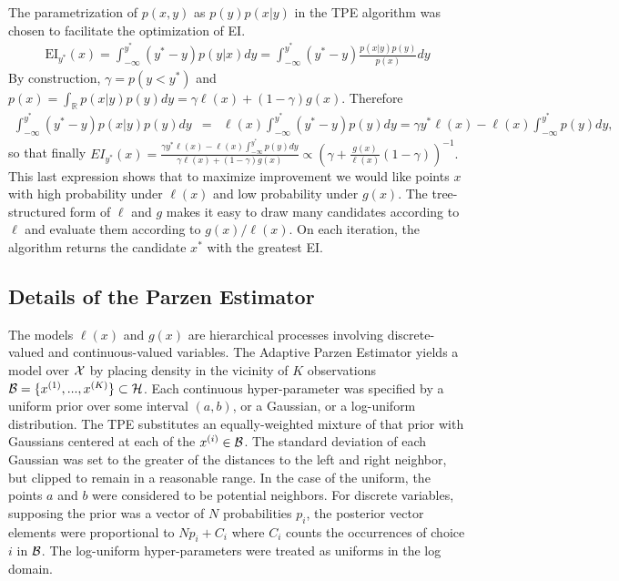 \documentclass{article}
\newcommand{\vs}[1]{\vspace*{-#1mm}}
\newcommand{\Bss}{\vs{1}}
\newcommand{\ass}{\vs{0.7}}
\begin{document}
The parametrization of $p(x, y)$ as $p(y)p(x|y)$ in the TPE algorithm was
chosen to facilitate the optimization of EI.
\begin{align}
    \mathrm{EI}_{y^*}(x)
    = \int_{-\infty}^{y^*} (y^* - y)p(y|x) dy
    = \int_{-\infty}^{y^*} (y^* - y) \frac{p(x|y)p(y)}{p(x)}
    dy
\end{align}
By construction, $\gamma = p(y<y^*)$ and
$
p(x) = \int_\mathbb{R} p(x\vert y) p(y) dy = \gamma \ell(x) +
(1-\gamma) g(x).
$
Therefore
\begin{eqnarray}
\int_{-\infty}^{y^*} (y^* - y) p(x|y)p(y) dy &=&
\ell(x)\int_{-\infty}^{y^*} (y^* - y) p(y) dy\nonumber= \gamma y^*\ell(x) - \ell(x)\int_{-\infty}^{y^*} p(y)dy,
\end{eqnarray}
so that finally
$
EI_{y^*}(x) = \frac{\gamma y^*\ell(x) - \ell(x)\int_{-\infty}^{y^*} p(y)dy}{\gamma \ell(x) +
(1-\gamma) g(x)}
\propto \left( \gamma + \frac{g(x)}{\ell(x)}(1-\gamma)\right)^{-1}.
$
This last expression shows that to maximize improvement we would like
points $x$ with high probability under $\ell(x)$ and low probability
under $g(x)$.
The tree-structured form of $\ell$ and $g$ makes it easy to draw many candidates according to $\ell$ and evaluate them according to $g(x)/\ell(x)$.
On each iteration, the algorithm returns the candidate $x^*$ with the greatest EI.

\Bss
\subsection{Details of the Parzen Estimator}
\ass

The models $\ell(x)$ and $g(x)$ are hierarchical processes involving discrete-valued and continuous-valued variables.
The Adaptive Parzen Estimator yields a model over ${\cal X}$ by placing density in
the vicinity of $K$ observations ${\cal B} = \{x^{(1)}, ..., x^{(K)}\} \subset
{\cal H}$.
Each continuous hyper-parameter was specified by a uniform prior over some
interval $(a, b)$,
or a Gaussian, or a log-uniform distribution.
The TPE substitutes an equally-weighted mixture of that prior with
Gaussians
centered at each of the $x^{(i)} \in {\cal B}$.
The standard deviation of each Gaussian was set to the greater of the
distances to the left and right neighbor, but clipped to remain in a
reasonable range.
In the case of the uniform, the points $a$ and $b$ were considered to be potential neighbors.
For discrete variables, supposing the prior was a vector of $N$ probabilities $p_i$,
the posterior vector elements were proportional to $Np_i + C_i$ where $C_i$
counts the occurrences of choice $i$ in $\cal B$.
The log-uniform hyper-parameters were treated as uniforms in the log domain.
\end{document}
